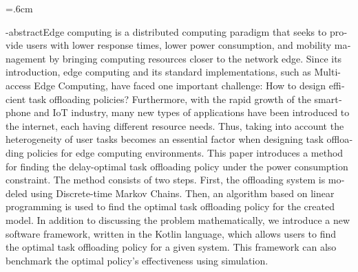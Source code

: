 
\baselineskip=.6cm
\begin{latin}
    \en-abstract{Edge computing is a distributed computing paradigm that seeks to provide users with lower response times, lower power consumption, and mobility management by bringing computing resources closer to the network edge. Since its introduction, edge computing and its standard implementations, such as Multi-access Edge Computing, have faced one important challenge: How to design efficient task offloading policies? Furthermore, with the rapid growth of the smartphone and IoT industry, many new types of applications have been introduced to the internet, each having different resource needs. Thus, taking into account the heterogeneity of user tasks becomes an essential factor when designing task offloading policies for edge computing environments. This paper introduces a method for finding the delay-optimal task offloading policy under the power consumption constraint. The method consists of two steps. First, the offloading system is modeled using Discrete-time Markov Chains. Then, an algorithm based on linear programming is used to find the optimal task offloading policy for the created model. In addition to discussing the problem mathematically, we introduce a new software framework, written in the Kotlin language, which allows users to find the optimal task offloading policy for a given system. This framework can also benchmark the optimal policy's effectiveness using simulation.
    }
    \latinfirstPage
\end{latin}
